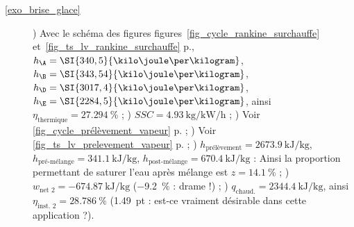 \begin{description}
		\item [\ref{exo_brise_glace}]
						) Avec le schéma des figures figures~\ref{fig_cycle_rankine_surchauffe} et~\ref{fig_ts_lv_rankine_surchauffe} p.\pageref{fig_ts_lv_rankine_surchauffe}, $h_\A = \SI{340,5}{\kilo\joule\per\kilogram}$, $h_\B = \SI{343,54}{\kilo\joule\per\kilogram}$, $h_\D = \SI{3017,4}{\kilo\joule\per\kilogram}$, $h_\E = \SI{2284,5}{\kilo\joule\per\kilogram}$, ainsi $\eta_\text{thermique} = \SI{27,294}{\percent}$ ;
						) $SSC = \SI[per-mode = symbol]{4,93}{\kilogram\per\kilo\watt\per\hour}$ ;
						) Voir \cref{fig_cycle_prélèvement_vapeur} p.\pageref{fig_cycle_prélèvement_vapeur} ;
						) Voir \cref{fig_ts_lv_prelevement_vapeur} p.\pageref{fig_ts_lv_prelevement_vapeur} ;
						) $h_\text{prélèvement} = \SI{2673,9}{\kilo\joule\per\kilogram}$, $h_\text{pré-mélange} = \SI{341,1}{\kilo\joule\per\kilogram}$, $h_\text{post-mélange} = \SI{670,4}{\kilo\joule\per\kilogram}$ : Ainsi la proportion permettant de saturer l’eau après mélange est $z = \SI{14,1}{\percent}$ ;
						) $w_\text{net~2} = \SI{-674,87}{\kilo\joule\per\kilogram}$ (\SI{-9,2}{\percent} : drame !) ;
						) $q_\text{chaud.} = \SI{2344,4}{\kilo\joule\per\kilogram}$, ainsi $\eta_\text{inst.~2} = \SI{28,786}{\percent}$ (\SI{+1,49}{pt} : est-ce vraiment désirable dans cette application ?).
	\end{description}
